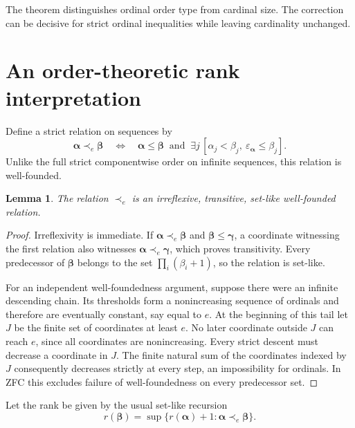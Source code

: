 \documentclass[11pt,letterpaper]{article}
\newtheorem{lemma}[theorem]{Lemma}
\theoremstyle{definition}
\theoremstyle{remark}
\newcommand{\seq}[1]{\boldsymbol{#1}}
\newcommand{\epsa}{\varepsilon_{\seq\alpha}}
\begin{document}
The theorem distinguishes ordinal order type from cardinal size. The correction can be decisive for strict ordinal inequalities while leaving cardinality unchanged.

\section{An order-theoretic rank interpretation}\label{sec:rank}

Define a strict relation on sequences by
\begin{equation}\label{eq:prec}
 \seq\alpha\prec_e\seq\beta
 \quad\Longleftrightarrow\quad
 \seq\alpha\le\seq\beta\ \text{ and }\
 \exists j\,[\alpha_j<\beta_j,\ \epsa\le\beta_j].
\end{equation}
Unlike the full strict componentwise order on infinite sequences, this relation is well-founded.

\begin{lemma}\label{lem:well-founded}
The relation $\prec_e$ is an irreflexive, transitive, set-like well-founded relation.
\end{lemma}
\begin{proof}
Irreflexivity is immediate. If $\seq\alpha\prec_e\seq\beta$ and $\seq\beta\le\seq\gamma$, a coordinate witnessing the first relation also witnesses $\seq\alpha\prec_e\seq\gamma$, which proves transitivity. Every predecessor of $\seq\beta$ belongs to the set $\prod_i(\beta_i+1)$, so the relation is set-like.

For an independent well-foundedness argument, suppose there were an infinite descending chain. Its thresholds form a nonincreasing sequence of ordinals and therefore are eventually constant, say equal to $e$. At the beginning of this tail let $J$ be the finite set of coordinates at least $e$. No later coordinate outside $J$ can reach $e$, since all coordinates are nonincreasing. Every strict descent must decrease a coordinate in $J$. The finite natural sum of the coordinates indexed by $J$ consequently decreases strictly at every step, an impossibility for ordinals. In ZFC this excludes failure of well-foundedness on every predecessor set.
\end{proof}

Let the rank be given by the usual set-like recursion
\begin{equation}\label{eq:rank-rec}
 r(\seq\beta)=\sup\{r(\seq\alpha)+1:\seq\alpha\prec_e\seq\beta\}.
\end{equation}
\end{document}
